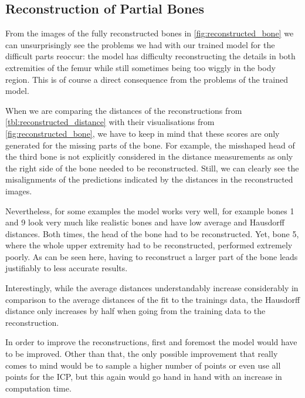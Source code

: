 
\subsection{Reconstruction of Partial Bones}
\label{subsec:reconresultsdisc}

From the images of the fully reconstructed bones in \autoref{fig:reconstructed_bone} we can unsurprisingly see the problems we had with our trained model for the difficult parts reoccur: the model has difficulty reconstructing the details in both extremities of the femur while still sometimes being too wiggly in the body region. This is of course a direct consequence from the problems of the trained model.

When we are comparing the distances of the reconstructions from \autoref{tbl:reconstructed_distance} with their visualisations from \autoref{fig:reconstructed_bone}, we have to keep in mind that these scores are only generated for the missing parts of the bone. For example, the misshaped head of the third bone is not explicitly considered in the distance measurements as only the right side of the bone needed to be reconstructed. Still, we can clearly see the misalignments of the predictions indicated by the distances in the reconstructed images.

Nevertheless, for some examples the model works very well, for example bones 1 and 9 look very much like realistic bones and have low average and Hausdorff distances. Both times, the head of the bone had to be reconstructed. Yet, bone 5, where the whole upper extremity had to be reconstructed, performed extremely poorly. As can be seen here, having to reconstruct a larger part of the bone leads justifiably to less accurate results.

Interestingly, while the average distances understandably increase considerably in comparison to the average distances of the fit to the trainings data, the Hausdorff distance only increases by half when going from the training data to the reconstruction.

In order to improve the reconstructions, first and foremost the model would have to be improved. Other than that, the only possible improvement that really comes to mind would be to sample a higher number of points or even use all points for the ICP, but this again would go hand in hand with an increase in computation time.